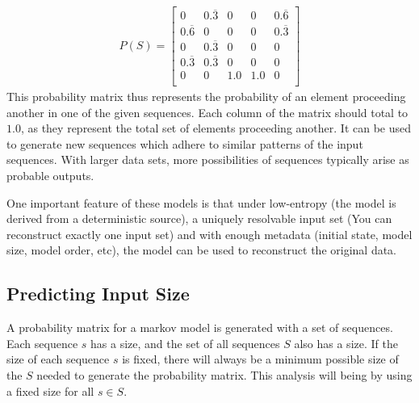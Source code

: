 \begin{align}
P(S) = \left[
\begin{matrix}
0 & 0.\overline{3} & 0 & 0 & 0.\overline{6} \\ 
0.\overline{6} & 0 & 0 & 0 & 0.\overline{3} \\ 
0 & 0.\overline{3} & 0 & 0 & 0 \\ 
0.\overline{3} & 0.\overline{3} & 0 & 0 & 0\\ 
0 & 0 & 1.0 & 1.0 & 0 \\ 
\end{matrix}\right] \label{eqn:Example-prob-matrix-1}
\end{align}
This probability matrix thus represents the probability of an element proceeding another in one of the given sequences. Each column of the matrix should total to $1.0$, as they represent the total set of elements proceeding another. It can be used to generate new sequences which adhere to similar patterns of the input sequences. With larger data sets, more possibilities of sequences typically arise as probable outputs. 

One important feature of these models is that under low-entropy (the model is derived from a deterministic source), a uniquely resolvable input set (You can reconstruct exactly one input set) and with enough metadata (initial state, model size, model order, etc), the model can be used to reconstruct the original data.





\subsection{Predicting Input Size}

A probability matrix for a markov model is generated with a set of sequences. Each sequence $s$ has a size, and the set of all sequences $S$ also has a size. If the size of each sequence $s$ is fixed, there will always be a minimum possible size of the $S$ needed to generate the probability matrix. This analysis will being by using a fixed size for all $s\in S$.

